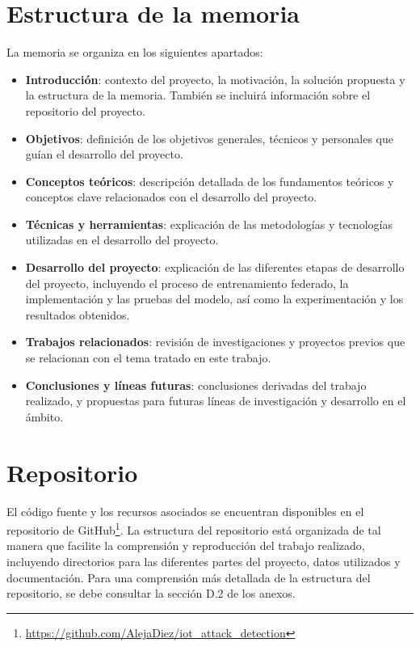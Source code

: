 \section{Estructura de la memoria}
\label{sec:Estructura}
La memoria se organiza en los siguientes apartados:
\begin{itemize}
    \item \textbf{Introducción}: contexto del proyecto, la motivación, la solución propuesta y la estructura de la memoria. También se incluirá información sobre el repositorio del proyecto.
    \item \textbf{Objetivos}: definición de los objetivos generales, técnicos y personales que guían el desarrollo del proyecto.
    \item \textbf{Conceptos teóricos}: descripción detallada de los fundamentos teóricos y conceptos clave relacionados con el desarrollo del proyecto.
    \item \textbf{Técnicas y herramientas}: explicación de las metodologías y tecnologías utilizadas en el desarrollo del proyecto.
    \item \textbf{Desarrollo del proyecto}: explicación de las diferentes etapas de desarrollo del proyecto, incluyendo el proceso de entrenamiento federado, la implementación y las pruebas del modelo, así como la experimentación y los resultados obtenidos.
    \item \textbf{Trabajos relacionados}: revisión de investigaciones y proyectos previos que se relacionan con el tema tratado en este trabajo.
    \item \textbf{Conclusiones y líneas futuras}: conclusiones derivadas del trabajo realizado, y propuestas para futuras líneas de investigación y desarrollo en el ámbito.
\end{itemize}

\section{Repositorio}
\label{sec:Repositorio}
El código fuente y los recursos asociados se encuentran disponibles en el repositorio de GitHub\footnote{\url{https://github.com/AlejaDiez/iot_attack_detection}}. La estructura del repositorio está organizada de tal manera que facilite la comprensión y reproducción del trabajo realizado, incluyendo directorios para las diferentes partes del proyecto, datos utilizados y documentación. Para una comprensión más detallada de la estructura del repositorio, se debe consultar la sección D.2 de los anexos.
